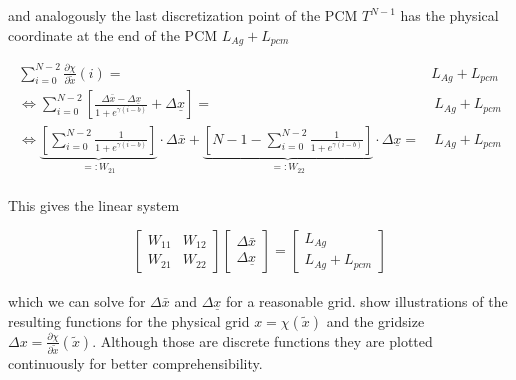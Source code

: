 \documentclass{scrartcl}[12pt, halfparskip]
\numberwithin{equation}{section}
\numberwithin{figure}{section}
\numberwithin{table}{section}
\begin{document}
and analogously the last discretization point of the PCM $T^{N-1}$ has the physical coordinate at the end of the PCM $L_{Ag}+L_{pcm}$

\begin{subequations}
	\begin{align}
	\sum_{i=0}^{N - 2} \frac{\partial \chi}{\partial \tilde{x}}(i) = \ & L_{Ag}+L_{pcm} \\
	\Leftrightarrow \sum_{i=0}^{N - 2} \left[ \frac{\Delta \bar{x} - \Delta \underline{x}}{1 + e^{\gamma(i - b)}} + \Delta \underline{x} \right] = & \ L_{Ag}+L_{pcm} \\
	\Leftrightarrow \underbrace{ \left[ \sum_{i=0}^{N - 2} \frac{1}{1 + e^{\gamma(i - b)}} \right] }_{=: W_{21}} \cdot \Delta \bar{x} + \underbrace{ \left[ N - 1 - \sum_{i=0}^{N - 2} \frac{1}{1 + e^{\gamma(i - b)}} \right] }_{=: W_{22}} \cdot \Delta \underline{x} = & \ L_{Ag}+L_{pcm}
	\end{align}
\end{subequations} \\

This gives the linear system

\begin{equation}
	\begin{bmatrix}
		W_{11} & W_{12} \\
		W_{21} & W_{22}
	\end{bmatrix}
	\begin{bmatrix}
		\Delta \bar{x} \\
		\Delta \underline{x}
	\end{bmatrix}
	= 
	\begin{bmatrix}
		L_{Ag} \\
		L_{Ag} + L_{pcm}
	\end{bmatrix}
\end{equation} \\
  
 which we can solve for $\Delta \bar{x}$ and $\Delta \underline{x}$ for a reasonable grid.  show illustrations of the resulting functions for the physical grid $x = \chi(\tilde{x})$ and the gridsize $\Delta x = \frac{\partial \chi}{\partial \tilde{x}}(\tilde{x})$. Although those are discrete functions they are plotted continuously for better comprehensibility. \\
\end{document}
